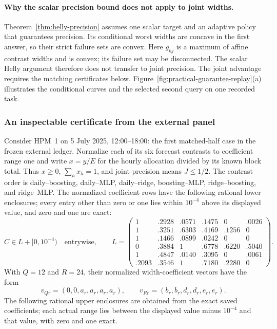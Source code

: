 \documentclass[12pt]{article}
\begin{document}
\paragraph{Why the scalar precision bound does not apply to joint widths.}
Theorem~\ref{thm:helly-precision} assumes one scalar target and an adaptive
policy that guarantees precision. Its conditional worst widths are concave
in the first answer, so their strict failure sets are convex. Here $g_{kj}$
is a maximum of affine contrast widths and is convex; its failure set may
be disconnected. The scalar Helly argument therefore does not transfer to
joint precision. The joint advantage requires the matching certificates
below. Figure~\ref{fig:practical-guarantee-replay}(a) illustrates the
conditional curves and the selected second query on one recorded task.
\subsubsection{An inspectable certificate from the external panel}
\label{sec:worked-joint-certificate}
Consider HPM~1 on 5 July 2025, 12:00--18:00: the first matched-half case
in the frozen external ledger.  Normalize each of its six forecast
contrasts to coefficient range one and write $x=y/E$ for the hourly
allocation divided by its known block total. Thus $x\geq0$, $\sum_hx_h=1$,
and joint precision means $J\leq1/2$. The contrast order is
daily--boosting, daily--MLP, daily--ridge, boosting--MLP,
ridge--boosting, and ridge--MLP.  The normalized coefficient rows have
the following rational lower enclosures; every entry other than zero
or one lies within $10^{-4}$ above its displayed value, and zero and one
are exact:
\[
 C\in L+[0,10^{-4})\quad\text{entrywise},\qquad
 L=\begin{pmatrix}
 1&.2928&.0571&.1475&0&.0026\\
 1&.3251&.6303&.4169&.1256&0\\
 1&.1466&.0899&.0242&0&0\\
 0&.3884&1&.6778&.6220&.5040\\
 1&.4847&.0140&.3095&0&.0061\\
 .2093&.3546&1&.7180&.2280&0
 \end{pmatrix}.
\]
With $Q=12$ and $R=24$, their normalized width-coefficient
vectors have the form
\[
 v_{Qr}=(0,0,a_r,a_r,a_r,a_r),\qquad
 v_{Rr}=(b_r,b_r,d_r,d_r,e_r,e_r).
\]
The following rational upper enclosures are obtained from the exact saved
coefficients; each actual range lies between the displayed value minus
$10^{-4}$ and that value, with zero and one exact.
\end{document}
